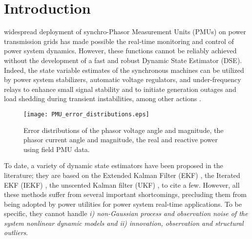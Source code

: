 \documentclass[10pt]{IEEEtran}
\begin{document}
\IEEEpeerreviewmaketitle
\vspace{-0.5cm}
\section{Introduction}
 widespread deployment of synchro-Phasor Measurement Units (PMUs) on power transmission grids has made possible the real-time monitoring and control of power system dynamics. However, these functions cannot be reliably achieved without the development of a fast and robust Dynamic State Estimator (DSE). Indeed, the state variable estimates of the synchronous machines can be utilized by power system stabilizers, automatic voltage regulators, and under-frequency relays to enhance small signal stability and to initiate generation outages and load shedding during transient instabilities, among other actions \cite{Kamwa2001,Mili2002}.

\begin{figure*}[!t]
\centering
\texttt{[image: PMU\_error\_distributions.eps]}
\caption{Error distributions of the phasor voltage angle and magnitude, the phasor current angle and magnitude, the real and reactive power using field PMU data.}
\label{Fig.non_gaussian_noise_real_data}
\end{figure*}
To date, a variety of dynamic state estimators have been proposed in the literature; they are based on the Extended Kalman Filter (EKF) \cite{EKFKamwa2011,ZHuangKJ2007}, the Iterated EKF (IEKF) \cite{FanWhbe2013,Junbo_GMIEKF2016}, the unscented Kalman filter (UKF) \cite{ABCPal2014,APSMelipoulos2012,Rouhani2016}, to cite a few. However, all these methods suffer from several important shortcomings, precluding them from being adopted by power utilities for power system real-time applications. To be specific, they cannot handle \emph{i) non-Gaussian process and observation noise of the system nonlinear dynamic models and ii) innovation, observation and structural outliers}.
\end{document}
